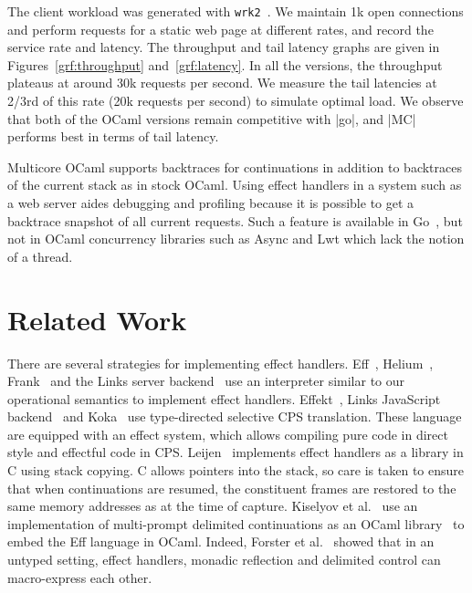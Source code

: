 \documentclass[sigplan,screen]{acmart}
\begin{document}
The client workload was generated with \texttt{wrk2}~\cite{wrk2}. We maintain
1k open connections and perform requests for a static web page at different
rates, and record the service rate and latency. The throughput and tail latency
graphs are given in Figures~\ref{grf:throughput} and~\ref{grf:latency}. In all
the versions, the throughput plateaus at around 30k requests per second. We
measure the tail latencies at 2/3rd of this rate (20k requests per second) to
simulate optimal load. We observe that both of the OCaml versions remain
competitive with |go|, and |MC| performs best in terms of tail latency.

Multicore OCaml supports backtraces for continuations in addition to backtraces
of the current stack as in stock OCaml. Using effect handlers in a system such
as a web server aides debugging and profiling because it is possible to get a
backtrace snapshot of all current requests. Such a feature is available in
Go~\cite{gopprof}, but not in OCaml concurrency libraries such as Async and
Lwt which lack the notion of a thread.

\section{Related Work}
\label{sec:related}

There are several strategies for implementing effect handlers. Eff~\cite{Eff},
Helium~\cite{Biernacki20}, Frank~\cite{Frank} and the Links server
backend~\cite{Hillerstrom20} use an interpreter similar to our operational
semantics to implement effect handlers. Effekt~\cite{Effekt}, Links JavaScript
backend~\cite{Hillerstrom20} and Koka~\cite{Leijen17} use type-directed
selective CPS translation. These language are equipped with an effect system,
which allows compiling pure code in direct style and effectful code in CPS.
Leijen~\cite{Leijen14} implements effect handlers as a library in C using stack
copying. C allows pointers into the stack, so care is taken to ensure that
when continuations are resumed, the constituent frames are restored to the same
memory addresses as at the time of capture. Kiselyov et al.~\cite{Kiselyov18}
use an implementation of multi-prompt delimited continuations as an OCaml
library~\cite{Kiselyov12} to embed the Eff language in OCaml. Indeed, Forster et
al.~\cite{Forster19} showed that in an untyped setting, effect handlers,
monadic reflection and delimited control can macro-express each other.
\end{document}
